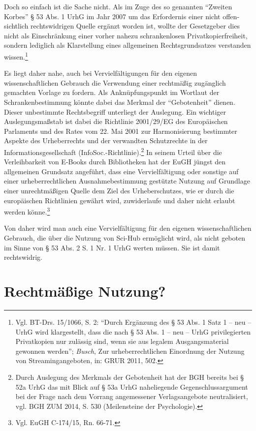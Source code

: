 \documentclass[a4paper,
fontsize=11pt,
oneside,
numbers=noperiodatend,
parskip=half-,
bibliography=totoc,
final
]{scrartcl}
\begin{document}
Doch so einfach ist die Sache nicht. Als im Zuge des so genannten
\enquote{Zweiten Korbes} § 53 Abs. 1 UrhG im Jahr 2007 um das
Erfordernis einer nicht offen­sichtlich rechtswidrigen Quelle ergänzt
worden ist, wollte der Gesetzgeber dies nicht als Einschränkung einer
vorher nahezu schrankenlosen Privatkopierfreiheit, sondern lediglich als
Klarstellung eines allgemeinen Rechtsgrundsatzes verstanden
wissen.\footnote{Vgl. BT-Drs. 15/1066, S. 2: \enquote{Durch Ergänzung
  des § 53 Abs. 1 Satz 1 -- neu -- UrhG wird klargestellt, dass die nach
  § 53 Abs. 1 -- neu -- UrhG privilegierten Privatkopien nur zulässig
  sind, wenn sie aus legalem Ausgangsmaterial gewonnen werden};
  \emph{Busch}, Zur urheberrechtlichen Einordnung der Nutzung von
  Streamingangeboten, in: GRUR 2011, 502.}

Es liegt daher nahe, auch bei Vervielfältigungen für den eigenen
wissenschaftlichen Gebrauch die Verwendung einer rechtmäßig zugänglich
gemachten Vorlage zu fordern. Als Anknüpfungspunkt im Wortlaut der
Schrankenbestimmung könnte dabei das Merk­mal der \enquote{Gebotenheit}
dienen. Dieser unbestimmte Rechtsbegriff unterliegt der Auslegung. Ein
wichtiger Auslegungsmaßstab ist dabei die Richtlinie 2001/29/EG des
Europäischen Parlaments und des Rates vom 22. Mai 2001 zur
Harmonisierung bestimmter Aspekte des Urheberrechts und der verwandten
Schutzrechte in der Informationsgesellschaft
(InfoSoc.-Richtlinie).\footnote{Durch Auslegung des Merkmals der
  Gebotenheit hat der BGH bereits bei § 52a UrhG das mit Blick auf § 53a
  UrhG naheliegende Gegenschlussargument bei der Frage nach dem Vorrang
  angemessener Verlagsangebote neutralisiert, vgl. BGH ZUM 2014, S. 530
  (Meilensteine der Psychologie).} In seinem Urteil über die
Verleihbarkeit von E-Books durch Bibliotheken hat der EuGH jüngst den
allgemeinen Grundsatz angeführt, dass eine Vervielfältigung oder
sonstige auf einer urheberrechtlichen Ausnahmebestimmung gestützte
Nutzung auf Grundlage einer unrechtmäßigen Quelle dem Ziel des
Urheberschutzes, wie er durch die europäischen Richtlinien gewährt wird,
zuwiderlaufe und daher nicht erlaubt werden könne.\footnote{Vgl. EuGH
  C-174/15, Rn. 66-71.}

Von daher wird man auch eine Vervielfältigung für den eigenen
wissenschaftlichen Gebrauch, die über die Nutzung von Sci-Hub ermöglicht
wird, als nicht geboten im Sinne von § 53 Abs. 2 S. 1 Nr. 1 UrhG werten
müssen. Sie ist damit rechtswidrig.

\section{Rechtmäßige Nutzung?}\label{rechtmuxe4uxdfige-nutzung}
\end{document}
